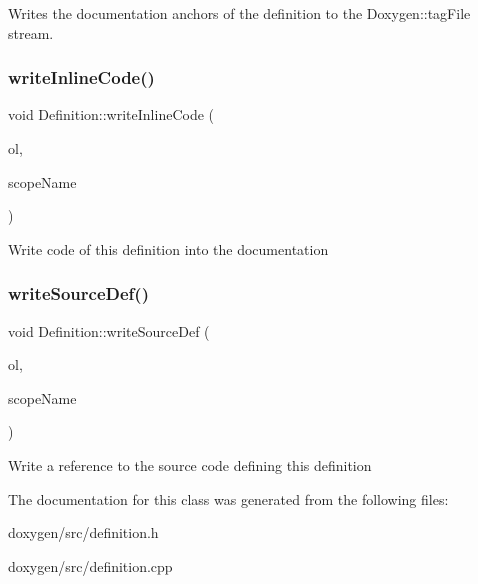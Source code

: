 Writes the documentation anchors of the definition to the Doxygen\+::tag\+File stream. \mbox{\label{class_definition_ad5ad17068a22165040e5b256c564c603}} 
\subsubsection{\texorpdfstring{writeInlineCode()}{writeInlineCode()}}
{\footnotesize\ttfamily void Definition\+::write\+Inline\+Code (\begin{DoxyParamCaption}\item[{\mbox{\hyperlink{class_output_list}{Output\+List}} \&}]{ol,  }\item[{const char $\ast$}]{scope\+Name }\end{DoxyParamCaption})}

Write code of this definition into the documentation \mbox{\label{class_definition_a0d22dcffc0afca75f8ab31dd6261933f}} 
\subsubsection{\texorpdfstring{writeSourceDef()}{writeSourceDef()}}
{\footnotesize\ttfamily void Definition\+::write\+Source\+Def (\begin{DoxyParamCaption}\item[{\mbox{\hyperlink{class_output_list}{Output\+List}} \&}]{ol,  }\item[{const char $\ast$}]{scope\+Name }\end{DoxyParamCaption})}

Write a reference to the source code defining this definition 

The documentation for this class was generated from the following files\+:\begin{DoxyCompactItemize}
\item 
doxygen/src/definition.\+h\item 
doxygen/src/definition.\+cpp\end{DoxyCompactItemize}
